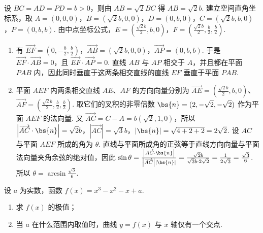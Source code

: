 \begin{solution}
设 \(BC=AD=PD=b>0\)，则由 \(AB=\sqrt2BC\) 得 \(AB=\sqrt2b\). 建立空间直角坐标系，取 \(A=(0,0,0)\)，\(B=(\sqrt2b,0,0)\)，\(D=(0,b,0)\)，\(C=(\sqrt2b,b,0)\)，\(P=(0,b,b)\). 由中点坐标公式，\(E=\left(\frac{\sqrt2b}{2},b,0\right)\)，\(F=\left(\frac{\sqrt2b}{2},\frac b2,\frac b2\right)\).

\begin{enumerate}
\item 有 \(\overrightarrow{EF}=\left(0,-\frac b2,\frac b2\right)\)，\(\overrightarrow{AB}=(\sqrt2b,0,0)\)，\(\overrightarrow{AP}=(0,b,b)\). 于是 \(\overrightarrow{EF}\cdot\overrightarrow{AB}=0\)，且 \(\overrightarrow{EF}\cdot\overrightarrow{AP}=0\). 直线 \(AB\) 与 \(AP\) 相交于 \(A\)，并且都在平面 \(PAB\) 内，因此同时垂直于这两条相交直线的直线 \(EF\) 垂直于平面 \(PAB\).
\item 平面 \(AEF\) 内两条相交直线 \(AE\)、\(AF\) 的方向向量分别为 \(\overrightarrow{AE}=\left(\frac{\sqrt2b}{2},b,0\right)\)、\(\overrightarrow{AF}=\left(\frac{\sqrt2b}{2},\frac b2,\frac b2\right)\). 取它们的叉积的非零倍数 \(\bs{n}=(2,-\sqrt2,-\sqrt2)\) 作为平面 \(AEF\) 的法向量. 又 \(\overrightarrow{AC}=C-A=b(\sqrt2,1,0)\)，所以 \(\left|\overrightarrow{AC}\cdot\bs{n}\right|=\sqrt2b\)，\(\left|\overrightarrow{AC}\right|=\sqrt3b\)，\(\left|\bs{n}\right|=\sqrt{4+2+2}=2\sqrt2\). 设 \(AC\) 与平面 \(AEF\) 所成的角为 \(\theta\). 直线与平面所成角的正弦等于直线方向向量与平面法向量夹角余弦的绝对值，因此
\(\sin\theta=\frac{\left|\overrightarrow{AC}\cdot\bs{n}\right|}{\left|\overrightarrow{AC}\right|\left|\bs{n}\right|}=\frac{\sqrt2b}{\sqrt3b\cdot2\sqrt2}=\frac{1}{2\sqrt3}=\frac{\sqrt3}{6}\). 所以 \(\theta=\arcsin\frac{\sqrt3}{6}\).
\end{enumerate}
\end{solution}

\begin{problem}
设 \(a\) 为实数，函数 \(f(x) = x^3 - x^2 - x + a\).

\begin{enumerate}
\item 求 \(f(x)\) 的极值；
\item 当 \(a\) 在什么范围内取值时，曲线 \(y = f(x)\) 与 \(x\) 轴仅有一个交点.
\end{enumerate}
\end{problem}

